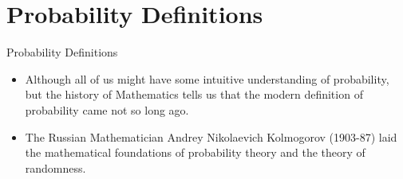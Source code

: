 \documentclass[8pt, usepdftitle = false]{beamer}
\begin{document}
\section{Probability Definitions}
\frame{\sectionpage}

\begin{frame}[allowframebreaks]{Probability Definitions}


\begin{itemize}


\item Although all of us might have some intuitive understanding of probability, but the history of Mathematics tells us that the modern definition of probability came not so long ago.

\item  The Russian Mathematician Andrey Nikolaevich Kolmogorov (1903-87) laid the mathematical foundations of probability theory and the theory of randomness. 



\end{itemize}
\end{frame}
\end{document}
